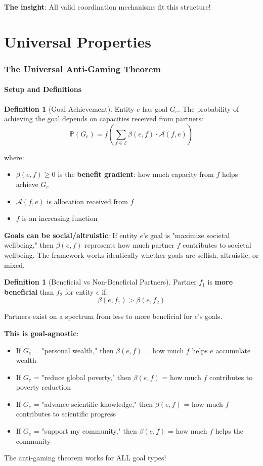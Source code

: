 \documentclass[11pt,a4paper]{article}
\theoremstyle{definition}
\newtheorem{definition}[theorem]{Definition}
\theoremstyle{remark}
\newcommand{\E}{\mathcal{E}}
\newcommand{\A}{\mathcal{A}}
\begin{document}
\textbf{The insight}: All valid coordination mechanisms fit this structure!

\part{Universal Properties}

\section{The Universal Anti-Gaming Theorem}

\subsection{Setup and Definitions}

\begin{definition}[Goal Achievement]
Entity $e$ has goal $G_e$. The probability of achieving the goal depends on capacities received from partners:
\[ \mathbb{P}(G_e) = f\left(\sum_{f \in \E} \beta(e,f) \cdot \A(f,e)\right) \]

where:
\begin{itemize}
\item $\beta(e,f) \ge 0$ is the \textbf{benefit gradient}: how much capacity from $f$ helps achieve $G_e$
\item $\A(f,e)$ is allocation received from $f$
\item $f$ is an increasing function
\end{itemize}

\textbf{Goals can be social/altruistic}: If entity $e$'s goal is "maximize societal wellbeing," then $\beta(e,f)$ represents how much partner $f$ contributes to societal wellbeing. The framework works identically whether goals are selfish, altruistic, or mixed.
\end{definition}

\begin{definition}[Beneficial vs Non-Beneficial Partners]
Partner $f_1$ is \textbf{more beneficial} than $f_2$ for entity $e$ if:
\[ \beta(e,f_1) > \beta(e,f_2) \]

Partners exist on a spectrum from less to more beneficial for $e$'s goals.

\textbf{This is goal-agnostic}:
\begin{itemize}
\item If $G_e$ = "personal wealth," then $\beta(e,f)$ = how much $f$ helps $e$ accumulate wealth
\item If $G_e$ = "reduce global poverty," then $\beta(e,f)$ = how much $f$ contributes to poverty reduction
\item If $G_e$ = "advance scientific knowledge," then $\beta(e,f)$ = how much $f$ contributes to scientific progress
\item If $G_e$ = "support my community," then $\beta(e,f)$ = how much $f$ helps the community
\end{itemize}

The anti-gaming theorem works for ALL goal types!
\end{definition}
\end{document}
